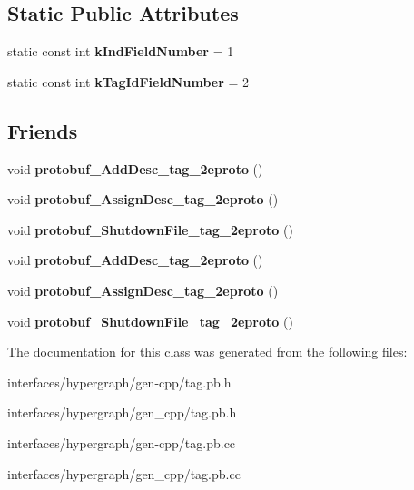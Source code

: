 \subsection*{Static Public Attributes}
\begin{DoxyCompactItemize}
\item 
\hypertarget{classTagging_acd90c8d2f16535b6a8810a911a047274}{
static const int {\bfseries kIndFieldNumber} = 1}
\label{classTagging_acd90c8d2f16535b6a8810a911a047274}

\item 
\hypertarget{classTagging_aee9291b65c5317b5d58c9dfab2d0af6d}{
static const int {\bfseries kTagIdFieldNumber} = 2}
\label{classTagging_aee9291b65c5317b5d58c9dfab2d0af6d}

\end{DoxyCompactItemize}
\subsection*{Friends}
\begin{DoxyCompactItemize}
\item 
\hypertarget{classTagging_a5b6e1d0ac3f12cf6b846b7bc86f7fc96}{
void {\bfseries protobuf\_\-AddDesc\_\-tag\_\-2eproto} ()}
\label{classTagging_a5b6e1d0ac3f12cf6b846b7bc86f7fc96}

\item 
\hypertarget{classTagging_a84116f221ec83265dfdeb3bb01f9bd6c}{
void {\bfseries protobuf\_\-AssignDesc\_\-tag\_\-2eproto} ()}
\label{classTagging_a84116f221ec83265dfdeb3bb01f9bd6c}

\item 
\hypertarget{classTagging_a955ed450e7afd4065ffef15152e72563}{
void {\bfseries protobuf\_\-ShutdownFile\_\-tag\_\-2eproto} ()}
\label{classTagging_a955ed450e7afd4065ffef15152e72563}

\item 
\hypertarget{classTagging_a5b6e1d0ac3f12cf6b846b7bc86f7fc96}{
void {\bfseries protobuf\_\-AddDesc\_\-tag\_\-2eproto} ()}
\label{classTagging_a5b6e1d0ac3f12cf6b846b7bc86f7fc96}

\item 
\hypertarget{classTagging_a84116f221ec83265dfdeb3bb01f9bd6c}{
void {\bfseries protobuf\_\-AssignDesc\_\-tag\_\-2eproto} ()}
\label{classTagging_a84116f221ec83265dfdeb3bb01f9bd6c}

\item 
\hypertarget{classTagging_a955ed450e7afd4065ffef15152e72563}{
void {\bfseries protobuf\_\-ShutdownFile\_\-tag\_\-2eproto} ()}
\label{classTagging_a955ed450e7afd4065ffef15152e72563}

\end{DoxyCompactItemize}


The documentation for this class was generated from the following files:\begin{DoxyCompactItemize}
\item 
interfaces/hypergraph/gen-\/cpp/tag.pb.h\item 
interfaces/hypergraph/gen\_\-cpp/tag.pb.h\item 
interfaces/hypergraph/gen-\/cpp/tag.pb.cc\item 
interfaces/hypergraph/gen\_\-cpp/tag.pb.cc\end{DoxyCompactItemize}
